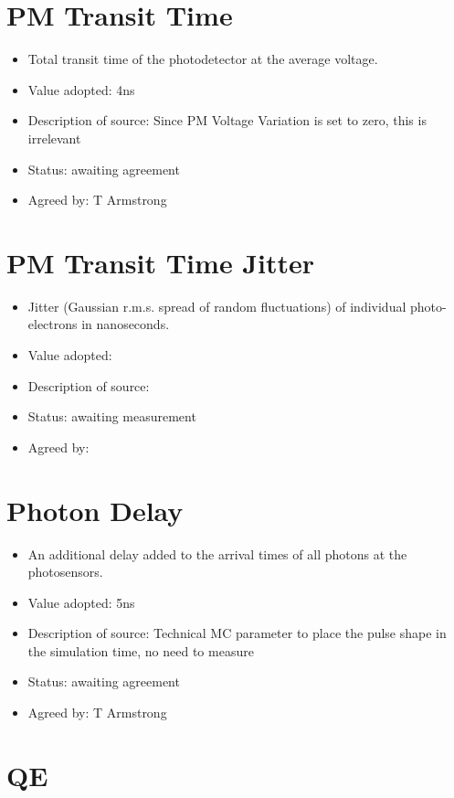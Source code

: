 \documentclass[GCT,short]{gct}
\begin{document}
\section{PM Transit Time}
\begin{itemize}
\item Total transit time of the photodetector at the average voltage.
\item Value adopted: 4ns
\item Description of source: Since PM Voltage Variation is set to zero, this is irrelevant
\item Status: \color{orange}awaiting agreement\color{black}
\item Agreed by: T Armstrong
\end{itemize}

\section{PM Transit Time Jitter}
\begin{itemize}
\item Jitter (Gaussian r.m.s. spread of random fluctuations) of individual photo-electrons in nanoseconds.
\item Value adopted: 
\item Description of source: 
\item Status: \color{red}awaiting measurement\color{black}
\item Agreed by: 
\end{itemize}

\section{Photon Delay}
\begin{itemize}
\item An additional delay added to the arrival times of all photons at the photosensors.
\item Value adopted: 5ns
\item Description of source: Technical MC parameter to place the pulse shape in the simulation time, no need to measure
\item Status: \color{orange}awaiting agreement\color{black}
\item Agreed by: T Armstrong
\end{itemize}

\section{QE}
\end{document}
